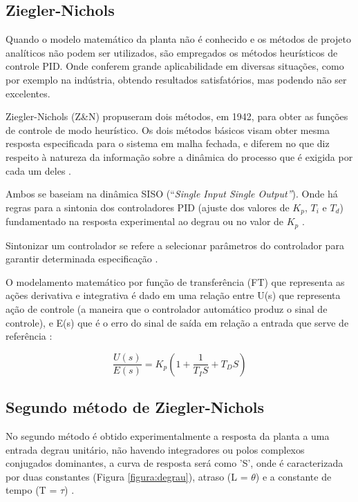 \documentclass[12 pt,conference]{IEEEtran}
\begin{document}
    \subsection{Ziegler-Nichols}
    
    Quando o modelo matemático da planta não é conhecido e os métodos de projeto analíticos não podem ser utilizados, são empregados os métodos heurísticos de controle PID. Onde conferem grande aplicabilidade em diversas situações, como por exemplo na indústria, obtendo resultados satisfatórios, mas podendo não ser excelentes.
    
    Ziegler-Nichols (Z\&N) propuseram dois métodos, em 1942, para obter as funções de controle de modo heurístico. Os dois métodos básicos visam obter mesma resposta especificada para o sistema em malha fechada, e diferem no que diz respeito à natureza da informação sobre a dinâmica do processo que é exigida por cada um deles \cite{teixeira2010controles}.
    
    Ambos se baseiam na dinâmica SISO (“\textit{Single Input Single Output”}). Onde há regras para a sintonia dos controladores PID (ajuste dos valores de \(K_{p}\), \(T_{i}\) e \(T_{d}\))  fundamentado na resposta experimental ao degrau ou no valor de \(K_{p}\) \cite{teixeira2010controles}.
    
    Sintonizar um controlador se refere a selecionar parâmetros do controlador para garantir determinada especificação \cite{ogata2011engenharia}.
    
    O modelamento matemático por função de transferência (FT) que representa as ações derivativa e integrativa é dado em uma relação entre U(s) que representa ação de controle (a maneira que o controlador automático produz o sinal de controle), e E(s) que é o erro do sinal de saída em relação a entrada que serve de referência \cite{ogata2011engenharia}:

    \begin{equation}
        \frac{U(s)}{E(s)} = K_p   (1 + \frac{1}{T_I S} + T_D S)
    \end{equation}
    
\subsection{Segundo método de Ziegler-Nichols}

No segundo método é obtido experimentalmente a resposta da planta a uma entrada degrau unitário, não havendo integradores ou polos complexos conjugados dominantes, a curva de resposta será como 'S', onde é caracterizada por duas constantes (Figura \ref{figura:degrau}), atraso (L = \(\theta\)) e a constante de tempo (T = \(\tau\)) \cite{teixeira2010controles}.
\end{document}
